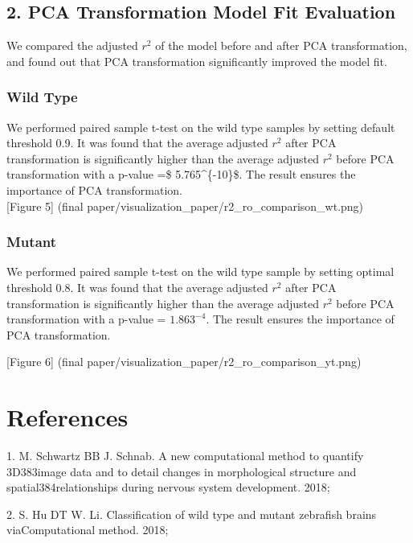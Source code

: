\documentclass[10pt,letterpaper]{article}
\begin{document}
\hypertarget{pca-transformation-model-fit-evaluation}{%
\subsection{2. PCA Transformation Model Fit
Evaluation}\label{pca-transformation-model-fit-evaluation}}

We compared the adjusted \(r^2\) of the model before and after PCA
transformation, and found out that PCA transformation significantly
improved the model fit.

\hypertarget{wild-type-1}{%
\subsubsection{Wild Type}\label{wild-type-1}}

We performed paired sample t-test on the wild type samples by setting
default threshold 0.9. It was found that the average adjusted \(r^2\)
after PCA transformation is significantly higher than the average
adjusted \(r^2\) before PCA transformation with a p-value =\$
5.765\^{}\{-10\}\$. The result ensures the importance of PCA
transformation.\\
{[}Figure 5{]} (final
paper/visualization\_paper/r2\_ro\_comparison\_wt.png)

\hypertarget{mutant-1}{%
\subsubsection{Mutant}\label{mutant-1}}

We performed paired sample t-test on the wild type sample by setting
optimal threshold 0.8. It was found that the average adjusted \(r^2\)
after PCA transformation is significantly higher than the average
adjusted \(r^2\) before PCA transformation with a p-value =
\(1.863^{-4}\). The result ensures the importance of PCA transformation.

{[}Figure 6{]} (final
paper/visualization\_paper/r2\_ro\_comparison\_yt.png)

\hypertarget{references}{%
\section*{References}\label{references}}

\hypertarget{refs}{}
\leavevmode\hypertarget{ref-Schwartz18}{}%
1. M. Schwartz BB J. Schnab. A new computational method to quantify
3D383image data and to detail changes in morphological structure and
spatial384relationships during nervous system development. 2018;

\leavevmode\hypertarget{ref-Hu18}{}%
2. S. Hu DT W. Li. Classification of wild type and mutant zebrafish
brains viaComputational method. 2018;

\nolinenumbers
\end{document}
